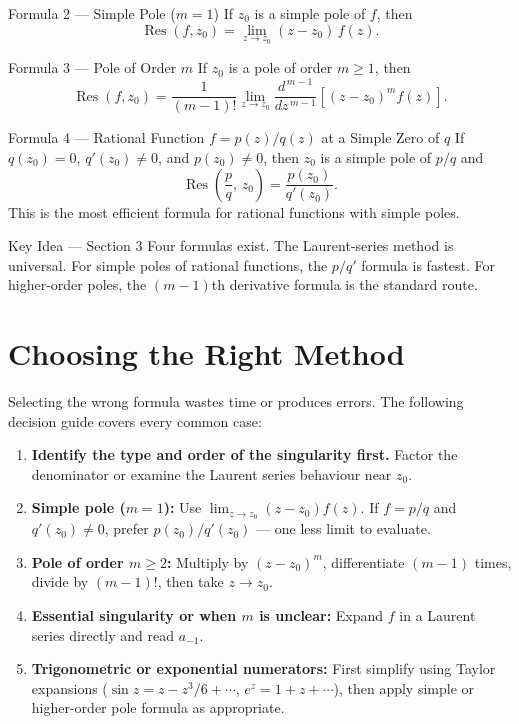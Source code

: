 \documentclass[12pt,a4paper]{article}
\begin{document}
\begin{infobox}{Formula 2 --- Simple Pole ($m=1$)}
If $z_0$ is a simple pole of $f$, then
\[
   \operatorname{Res}(f, z_0) = \lim_{z \to z_0}(z - z_0)\,f(z).
\]
\end{infobox}

\begin{infobox}{Formula 3 --- Pole of Order $m$}
If $z_0$ is a pole of order $m \geq 1$, then
\[
   \operatorname{Res}(f, z_0)
   = \frac{1}{(m-1)!}\lim_{z \to z_0}
     \frac{d^{\,m-1}}{dz^{\,m-1}}\!\left[(z-z_0)^m f(z)\right].
\]
\end{infobox}

\begin{infobox}{Formula 4 --- Rational Function $f = p(z)/q(z)$ at a Simple Zero of $q$}
If $q(z_0) = 0$, $q'(z_0) \neq 0$, and $p(z_0) \neq 0$, then $z_0$ is a simple pole of $p/q$ and
\[
   \operatorname{Res}\!\left(\frac{p}{q},\, z_0\right) = \frac{p(z_0)}{q'(z_0)}.
\]
This is the most efficient formula for rational functions with simple poles.
\end{infobox}

\begin{learnbox}{Key Idea --- Section 3}
Four formulas exist.  The Laurent-series method is universal.  For simple poles of rational
functions, the $p/q'$ formula is fastest.  For higher-order poles, the $(m-1)$th derivative formula
is the standard route.
\end{learnbox}

\section{Choosing the Right Method}

Selecting the wrong formula wastes time or produces errors.  The following decision guide
covers every common case:

\begin{enumerate}[leftmargin=*]
  \item \textbf{Identify the type and order of the singularity first.}
        Factor the denominator or examine the Laurent series behaviour near $z_0$.
  \item \textbf{Simple pole ($m=1$):}
        Use $\lim_{z\to z_0}(z-z_0)f(z)$.
        If $f = p/q$ and $q'(z_0)\neq 0$, prefer $p(z_0)/q'(z_0)$ --- one less limit to evaluate.
  \item \textbf{Pole of order $m \geq 2$:}
        Multiply by $(z-z_0)^m$, differentiate $(m-1)$ times, divide by $(m-1)!$, then take $z\to z_0$.
  \item \textbf{Essential singularity or when $m$ is unclear:}
        Expand $f$ in a Laurent series directly and read $a_{-1}$.
  \item \textbf{Trigonometric or exponential numerators:}
        First simplify using Taylor expansions ($\sin z = z - z^3/6 + \cdots$, $e^z = 1 + z + \cdots$),
        then apply simple or higher-order pole formula as appropriate.
\end{enumerate}
\end{document}

